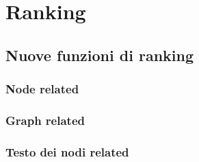 \section {Ranking}

\subsection {Nuove funzioni di ranking}

\subsubsection {Node related}
\subsubsection {Graph related}
\subsubsection {Testo dei nodi related}





